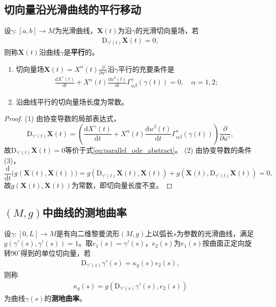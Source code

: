 \documentclass[../../main.tex]{subfiles}%
\begin{document}
\subsection{切向量沿光滑曲线的平行移动}

\begin{definition}
设$\gamma:[a,b]\to M$为光滑曲线，$\boldsymbol{X}(t)$为沿$\gamma$的光滑切向量场，若
\begin{align}
\mathrm{D}_{\gamma'(t)}\boldsymbol{X}(t)=0,\label{eq:parallel_def_abstract}
\end{align}
则称$\boldsymbol{X}(t)$沿曲线$\gamma$是\textbf{平行}的。
\end{definition}

\begin{theorem}
\begin{enumerate}[(1)]
\item 切向量场$\boldsymbol{X}(t)=X^\alpha(t)\frac{\partial}{\partial u^\alpha}$沿$\gamma$平行的充要条件是
\begin{align}
\frac{\mathrm{d}X^\gamma(t)}{\mathrm{d}t}+X^\alpha(t)\frac{\mathrm{d}u^\beta(t)}{\mathrm{d}t}\Gamma_{\alpha\beta}^\gamma(\gamma(t))=0,\quad \alpha=1,2;\label{eq:parallel_ode_abstract}
\end{align}
\item 沿曲线平行的切向量场长度为常数。
\end{enumerate}
\end{theorem}

\begin{proof}
(1) 由协变导数的局部表达式，
\[
\mathrm{D}_{\gamma'(t)}\boldsymbol{X}(t)=\left(\frac{\mathrm{d}X^\gamma(t)}{\mathrm{d}t}+X^\alpha(t)\frac{\mathrm{d}u^\beta(t)}{\mathrm{d}t}\Gamma_{\alpha\beta}^\gamma(\gamma(t))\right)\frac{\partial}{\partial u^\gamma},
\]
故$\mathrm{D}_{\gamma'(t)}\boldsymbol{X}(t)=0$等价于式\eqref{eq:parallel_ode_abstract}。
(2) 由协变导数的条件(3)，
\[
\frac{\mathrm{d}}{\mathrm{d}t}\big(g(\boldsymbol{X}(t),\boldsymbol{X}(t))\big)=g(\mathrm{D}_{\gamma'(t)}\boldsymbol{X}(t),\boldsymbol{X}(t))+g(\boldsymbol{X}(t),\mathrm{D}_{\gamma'(t)}\boldsymbol{X}(t))=0,
\]
故$g(\boldsymbol{X}(t),\boldsymbol{X}(t))$为常数，即切向量长度不变。
\end{proof}

\subsection{$(M,g)$中曲线的测地曲率}

\begin{definition}
设$\gamma:[0,L]\to M$是有向二维黎曼流形$(M,g)$上以弧长$s$为参数的光滑曲线，满足$g(\gamma'(s),\gamma'(s))=1$。取$e_1(s)=\gamma'(s)$，$e_2(s)$为$e_1(s)$按曲面正定向旋转$90^\circ$得到的单位切向量，若
\begin{align}
\mathrm{D}_{\gamma'(s)}\gamma'(s)=\kappa_g(s)e_2(s),\label{eq:7.16}
\end{align}
则称
\begin{align*}
\kappa_g(s)=g\left(\mathrm{D}_{\gamma'(s)}\gamma'(s),e_2(s)\right)
\end{align*}
为曲线$\gamma(s)$的\textbf{测地曲率}。
\end{definition}
\end{document}
